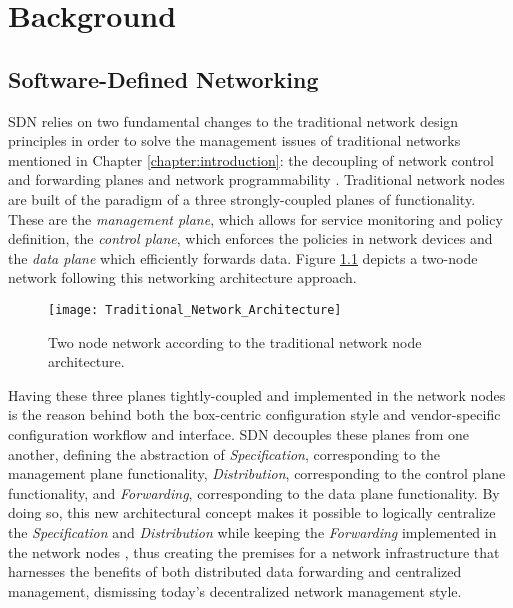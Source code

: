 
\chapter{Background}
\label{chapter:state-of-the-art}
%
\section{Software-Defined Networking}
\label{section:software-defined-network}
\gls{SDN} relies on two fundamental changes to the traditional network design principles in order to solve the management issues of traditional networks mentioned in Chapter \ref{chapter:introduction}: the decoupling of network control and forwarding planes and network programmability \cite{OFWP}.
% 
Traditional network nodes are built of the paradigm of a three strongly-coupled planes of functionality.
These are the \emph{management plane}, which allows for service monitoring and policy definition, the \emph{control plane}, which enforces the policies in network devices and the \emph{data plane} which efficiently forwards data.
Figure \ref{fig:Traditional_Network_Architecture} depicts a two-node network following this networking architecture approach.\\
\begin{figure}
	\centering
	\texttt{[image: Traditional\_Network\_Architecture]}
	\caption{Two node network according to the traditional network node architecture.}
	\label{fig:Traditional_Network_Architecture}
\end{figure}
%
Having these three planes tightly-coupled and implemented in the network nodes is the reason behind both the box-centric configuration style and vendor-specific configuration workflow and interface.
\gls{SDN} decouples these planes from one another, defining the abstraction of \emph{Specification}, corresponding to the management plane functionality, \emph{Distribution}, corresponding to the control plane functionality, and \emph{Forwarding}, corresponding to the data plane functionality.
By doing so, this new architectural concept makes it possible to logically centralize the \emph{Specification} and \emph{Distribution} while keeping the \emph{Forwarding} implemented in the network nodes \cite{Kreutz2014}\cite{OFWP}\cite{OpenNetworkingFoundation}, thus creating the premises for a network infrastructure that harnesses the benefits of both distributed data forwarding and centralized management, dismissing today's decentralized network management style.\\
